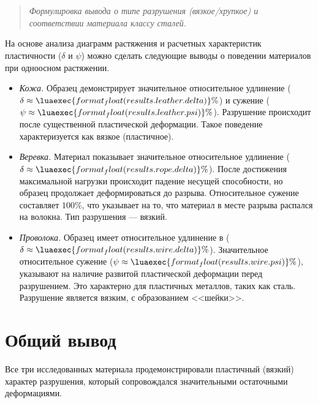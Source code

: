 \section*{  }
\begin{quote}
    \textit{Формулировка вывода о типе разрушения (вязкое/хрупкое) и соответствии материала классу сталей.}
\end{quote}

На основе анализа диаграмм растяжения и расчетных характеристик пластичности ($\delta$ и $\psi$) можно сделать следующие выводы о поведении материалов при одноосном растяжении.

\begin{itemize}
    \item \textit{Кожа.} Образец демонстрирует значительное относительное удлинение ($\delta \approx \luaexec{format_float(results.leather.delta)}\%$) и сужение ($\psi \approx \luaexec{format_float(results.leather.psi)}\%$). Разрушение происходит после существенной пластической деформации. Такое поведение характеризуется как вязкое (пластичное).
    
    \item \textit{Веревка.} Материал показывает значительное относительное удлинение ($\delta \approx \luaexec{format_float(results.rope.delta)}\%$). После достижения максимальной нагрузки происходит падение несущей способности, но образец продолжает деформироваться до разрыва. Относительное сужение составляет $100\%$, что указывает на то, что материал в месте разрыва распался на волокна. Тип разрушения --- вязкий.
    
    \item \textit{Проволока.} Образец имеет относительное удлинение в ($\delta \approx \luaexec{format_float(results.wire.delta)}\%$). Значительное относительное сужение ($\psi \approx \luaexec{format_float(results.wire.psi)}\%$), указывают на наличие развитой пластической деформации перед разрушением. Это характерно для пластичных металлов, таких как сталь. Разрушение является вязким, с образованием <<шейки>>.
\end{itemize}

\section*{Общий вывод}
Все три исследованных материала продемонстрировали пластичный (вязкий) характер разрушения, который сопровождался значительными остаточными деформациями.